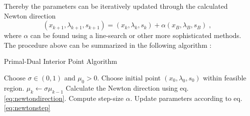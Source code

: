 Thereby the parameters can be iteratively updated through the calculated Newton direction
\begin{equation}
	(x_{k+1} , \lambda_{k+1} , s _{k+1}) = (x_{k} , \lambda_{k} , s _{k}) + \alpha  (x_B , \lambda_B , s_B) \; , \label{eq:newtonstep}
\end{equation}
where $\alpha$ can be found using a line-search or other more sophisticated methods.
The procedure above can be summarized in the following algorithm \cite{ipnote}:\\
\begin{algorithm}
\begin{algorithmic}
\caption{Primal-Dual Interior Point Algorithm}
\State Choose $\sigma \in (0,1)$ and $\mu_0 > 0$.
\State Choose initial point $(x_0 , \lambda_0 , s_0)$ within feasible region.
	\State $\mu_k \gets \sigma \mu_{k-1}$
	\State Calculate the Newton direction using eq. \eqref{eq:newtondirection}.
	\State Compute step-size $\alpha$.
	\State Update parameters according to eq. \eqref{eq:newtonstep}
\EndFor
\end{algorithmic}
\end{algorithm}


